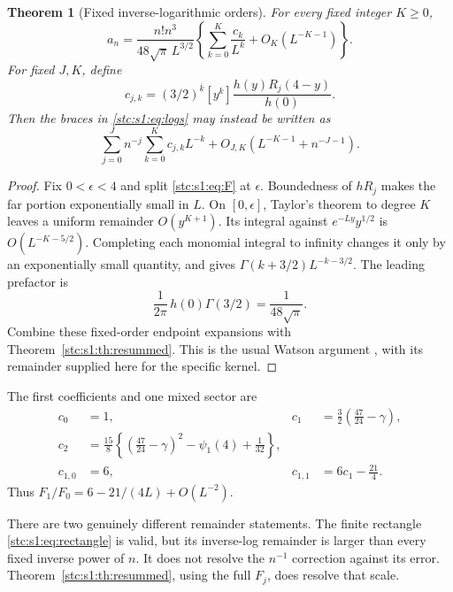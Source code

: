 \documentclass[11pt,letterpaper]{article}
\numberwithin{equation}{section}
\newtheorem{theorem}{Theorem}[section]
\theoremstyle{remark}\newtheorem{remark}[theorem]{Remark}
\newcommand{\rf}[2]{#1^{\overline{#2}}}
\newcommand{\coef}[2]{[#1^{#2}]}
\newcommand{\Ga}{\Gamma}
\begin{document}
\begin{theorem}[Fixed inverse-logarithmic orders]\label{stc:s1:th:logs}
For every fixed integer $K\geq0$,
\begin{equation}\label{stc:s1:eq:logs}
 a_n=\frac{n!n^3}{48\sqrt\pi\,L^{3/2}}
 \left\{\sum_{k=0}^K\frac{c_k}{L^k}+O_K(L^{-K-1})\right\}.
\end{equation}
For fixed $J,K$, define
\[
 c_{j,k}=\rf{(3/2)}{k}\coef{y}{k}
       \frac{h(y)R_j(4-y)}{h(0)}.
\]
Then the braces in \eqref{stc:s1:eq:logs} may instead be written as
\begin{equation}\label{stc:s1:eq:rectangle}
 \sum_{j=0}^J n^{-j}\sum_{k=0}^K c_{j,k}L^{-k}
       +O_{J,K}(L^{-K-1}+n^{-J-1}).
\end{equation}
\end{theorem}
\begin{proof}
Fix $0<\epsilon<4$ and split \eqref{stc:s1:eq:F} at $\epsilon$. Boundedness of $hR_j$ makes the far portion exponentially small in $L$. On $[0,\epsilon]$, Taylor's theorem to degree $K$ leaves a uniform remainder $O(y^{K+1})$. Its integral against $e^{-Ly}y^{1/2}$ is $O(L^{-K-5/2})$. Completing each monomial integral to infinity changes it only by an exponentially small quantity, and gives $\Ga(k+3/2)L^{-k-3/2}$. The leading prefactor is
\[
 \frac1{2\pi}\,h(0)\Ga(3/2)=\frac1{48\sqrt\pi}.
\]
Combine these fixed-order endpoint expansions with Theorem~\ref{stc:s1:th:resummed}. This is the usual Watson argument \cite{dlmfwatson}, with its remainder supplied here for the specific kernel.
\end{proof}
The first coefficients and one mixed sector are
\begin{align}
 c_0&=1,& c_1&=\frac32\left(\frac{47}{24}-\gamma\right),\label{stc:s1:eq:cfirst}\\
 c_2&=\frac{15}{8}\left\{\left(\frac{47}{24}-\gamma\right)^2
                       -\psi_1(4)+\frac1{32}\right\},\nonumber\\
 c_{1,0}&=6,& c_{1,1}&=6c_1-\frac{21}{4}.\nonumber
\end{align}
Thus $F_1/F_0=6-21/(4L)+O(L^{-2})$.

There are two genuinely different remainder statements. The finite rectangle \eqref{stc:s1:eq:rectangle} is valid, but its inverse-log remainder is larger than every fixed inverse power of $n$. It does not resolve the $n^{-1}$ correction against its error. Theorem~\ref{stc:s1:th:resummed}, using the full $F_j$, does resolve that scale.
\end{document}
